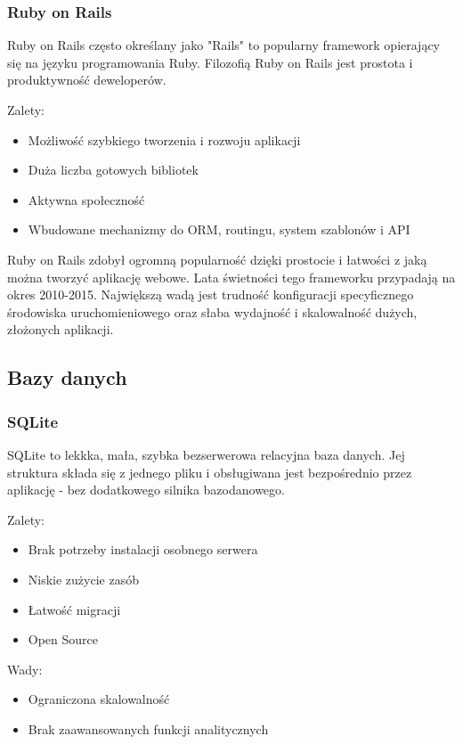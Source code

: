 \subsubsection{Ruby on Rails}

Ruby on Rails często określany jako "Rails" to popularny framework opierający się na języku programowania Ruby. Filozofią Ruby on Rails jest prostota i produktywność deweloperów.


Zalety:
\begin{itemize}
	\item Możliwość szybkiego tworzenia i rozwoju aplikacji
	\item Duża liczba gotowych bibliotek
	\item Aktywna społeczność
	\item Wbudowane mechanizmy do ORM, routingu, system szablonów i API
\end{itemize}


Ruby on Rails zdobył ogromną popularność dzięki prostocie i łatwości z jaką można tworzyć aplikację webowe. Lata świetności tego frameworku przypadają na okres 2010-2015. Największą wadą jest trudność konfiguracji specyficznego środowiska uruchomieniowego oraz słaba wydajność i skalowalność dużych, złożonych aplikacji.

\subsection{Bazy danych}

\subsubsection{SQLite}

SQLite to lekkka, mała, szybka bezserwerowa relacyjna baza danych. Jej struktura składa się z jednego pliku i obsługiwana jest bezpośrednio przez aplikację - bez dodatkowego silnika bazodanowego.

Zalety:
\begin{itemize}
	\item Brak potrzeby instalacji osobnego serwera
	\item Niskie zużycie zasób
	\item Łatwość migracji
	\item Open Source
\end{itemize}

Wady:
\begin{itemize}
	\item Ograniczona skalowalność
	\item Brak zaawansowanych funkcji analitycznych
\end{itemize}

